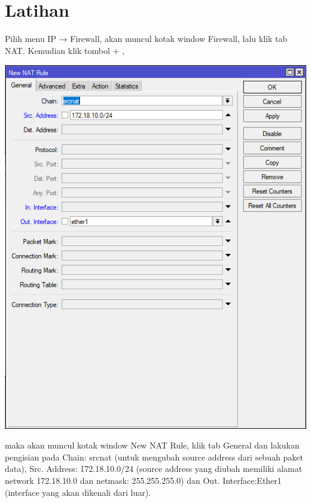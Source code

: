 \documentclass[a4paper,12pt]{article}
\begin{document}
\section{Latihan}
Pilih menu IP → Firewall, akan muncul kotak window Firewall, lalu klik tab NAT.	
Kemudian klik tombol + , 
\begin{center}
	\includegraphics[scale=.5]{lat1}
\end{center}
maka akan muncul kotak window New NAT Rule, klik tab General dan lakukan pengisian pada Chain: srcnat (untuk mengubah source address dari sebuah paket data), Src. Address: 172.18.10.0/24 (source address yang diubah memiliki alamat network 172.18.10.0 dan netmask: 255.255.255.0) dan Out. Interface:Ether1 (interface yang akan dikenali dari luar).	
\end{document}
